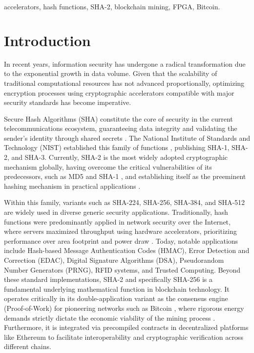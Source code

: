 \documentclass[conference]{IEEEtran}
\begin{document}
\begin{abstract}
This document is a model and instructions for \LaTeX.
This and the IEEEtran.cls file define the components of your paper [title, text, heads, etc.]. *CRITICAL: Do Not Use Symbols, Special Characters, Footnotes, 
or Math in Paper Title or Abstract.
\end{abstract}

\begin{IEEEkeywords}
accelerators, hash functions, SHA-2, blockchain mining, FPGA, Bitcoin.
\end{IEEEkeywords}

\section{Introduction}
In recent years, information security has undergone a radical transformation due to the exponential growth in data volume. Given that the scalability of traditional computational resources has not advanced proportionally, optimizing encryption processes using cryptographic accelerators compatible with major security standards has become imperative.

Secure Hash Algorithms (SHA) constitute the core of security in the current telecommunications ecosystem, guaranteeing data integrity and validating the sender's identity through shared secrets \cite{martino2020}. The National Institute of Standards and Technology (NIST) established this family of functions \cite{fips180}, publishing SHA-1, SHA-2, and SHA-3. Currently, SHA-2 is the most widely adopted cryptographic mechanism globally, having overcome the critical vulnerabilities of its predecessors, such as MD5 and SHA-1 \cite{sha1}, and establishing itself as the preeminent hashing mechanism in practical applications \cite{martino2020}.

Within this family, variants such as SHA-224, SHA-256, SHA-384, and SHA-512 are widely used in diverse generic security applications. Traditionally, hash functions were predominantly applied in network security over the Internet, where servers maximized throughput using hardware accelerators, prioritizing performance over area footprint and power draw \cite{martino2020}. Today, notable applications include Hash-based Message Authentication Codes (HMAC), Error Detection and Correction (EDAC), Digital Signature Algorithms (DSA), Pseudorandom Number Generators (PRNG), RFID systems, and Trusted Computing. Beyond these standard implementations, SHA-2 and specifically SHA-256 is a fundamental underlying mathematical function in blockchain technology. It operates critically in its double-application variant as the consensus engine (Proof-of-Work) for pioneering networks such as Bitcoin \cite{bitcoin}, where rigorous energy demands strictly dictate the economic viability of the mining process \cite{martino2020}. Furthermore, it is integrated via precompiled contracts in decentralized platforms like Ethereum \cite{eth} to facilitate interoperability and cryptographic verification across different chains.
\end{document}
